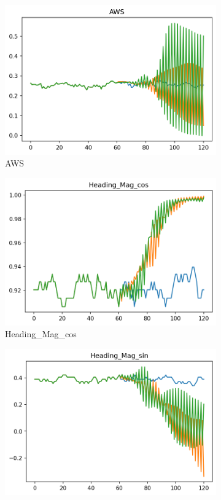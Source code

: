 \begin{figure}[ht]
\begin{subfigure}[b]{0.32\textwidth}
         \includegraphics[width=\textwidth]{figures/prediction-plots-joint/AWS.png}
         \caption{AWS}
     \end{subfigure}
     \begin{subfigure}[b]{0.32\textwidth}
         \centering
         \includegraphics[width=\textwidth]{figures/prediction-plots-joint/Heading_Mag_cos.png}
         \caption{Heading\_Mag\_cos}
     \end{subfigure}
     \begin{subfigure}[b]{0.32\textwidth}
         \centering
         \includegraphics[width=\textwidth]{figures/prediction-plots-joint/Heading_Mag_sin.png}

\end{subfigure}
\end{figure}

